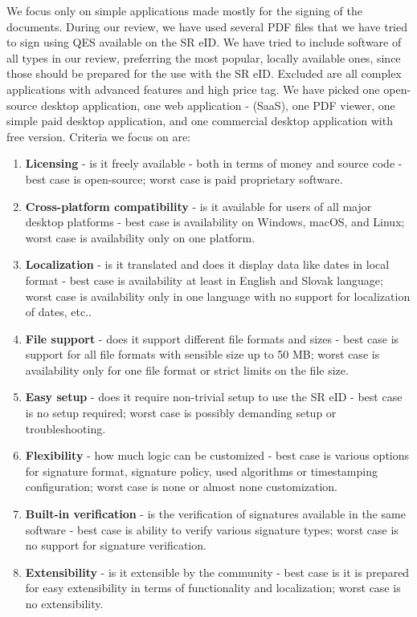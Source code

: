 \documentclass[thesismargins, english, thesislinespacing, onelinechapterstyle, upjsfrontpage]{rnthesis}
\begin{document}
We focus only on simple applications made mostly for the signing of the documents.
During our review, we have used several PDF files that we have tried to sign using QES available on the SR eID.
We have tried to include software of all types in our review, preferring the most popular, locally available ones, since those should be prepared for the use with the SR eID.
Excluded are all complex applications with advanced features and high price tag.
We have picked one open-source desktop application, one web application -  (SaaS), one PDF viewer, one simple paid desktop application, and one commercial desktop application with free version. Criteria we focus on are:

\begin{enumerate}
  \item \textbf{Licensing} - is it freely available - both in terms of money and source code - best case is open-source; worst case is paid proprietary software.
  \item \textbf{Cross-platform compatibility} - is it available for users of all major desktop platforms - best case is availability on Windows, macOS, and Linux; worst case is availability only on one platform.
  \item \textbf{Localization} - is it translated and does it display data like dates in local format - best case is availability at least in English and Slovak language; worst case is availability only in one language with no support for localization of dates, etc..
  \item \textbf{File support} - does it support different file formats and sizes - best case is support for all file formats with sensible size up to 50 MB; worst case is availability only for one file format or strict limits on the file size.
  \item \textbf{Easy setup} - does it require non-trivial setup to use the SR eID - best case is no setup required; worst case is possibly demanding setup or troubleshooting.
  \item \textbf{Flexibility} - how much logic can be customized - best case is various options for signature format, signature policy, used algorithms or timestamping configuration; worst case is none or almost none customization.
  \item \textbf{Built-in verification} - is the verification of signatures available in the same software - best case is ability to verify various signature types; worst case is no support for signature verification.
  \item \textbf{Extensibility} - is it extensible by the community - best case is it is prepared for easy extensibility in terms of functionality and localization; worst case is no extensibility.
\end{enumerate}
\end{document}
